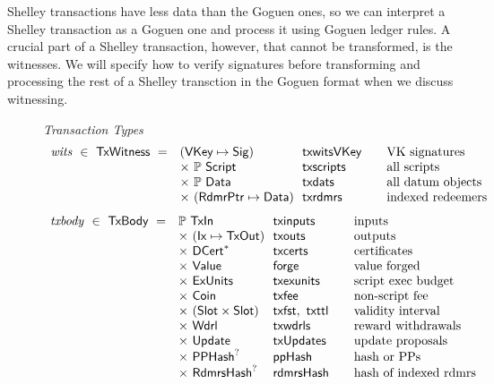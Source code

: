 Shelley transactions have less data than the Goguen ones, so we can interpret
a Shelley transaction as a Goguen one and process it using Goguen ledger
rules. A crucial part of a Shelley transaction,
however, that cannot be transformed, is the witnesses.
We will specify how to verify signatures before transforming and processing
the rest of a Shelley transction in the Goguen format when we discuss witnessing.

\begin{figure*}[htb]
  \emph{Transaction Types}
  \begin{equation*}
    \begin{array}{r@{~~}l@{~~}l@{\qquad}l}
      \var{wits} ~\in~ \TxWitness ~=~
       & (\VKey \mapsto \Sig) & \fun{txwitsVKey} & \text{VK signatures}\\
       & \times ~\powerset{\Script}  & \fun{txscripts} & \text{all scripts}\\
       & \times~ \powerset{\Data} & \fun{txdats} & \text{all datum objects}\\
       & \times ~(\RdmrPtr \mapsto \Data)& \fun{txrdmrs}& \text{indexed redeemers}\\
    \end{array}
  \end{equation*}
  \begin{equation*}
    \begin{array}{r@{~~}l@{~~}l@{\qquad}l}
      \var{txbody} ~\in~ \TxBody ~=~
      & \powerset{\TxIn} & \fun{txinputs}& \text{inputs}\\
      &\times ~(\Ix \mapsto \TxOut) & \fun{txouts}& \text{outputs}\\
      & \times~ \seqof{\DCert} & \fun{txcerts}& \text{certificates}\\
       & \times ~\Value  & \fun{forge} &\text{value forged}\\
       & \times ~\ExUnits  & \fun{txexunits}& \text{script exec budget}\\
       & \times ~\Coin & \fun{txfee} &\text{non-script fee}\\
       & \times ~(\Slot\times\Slot) & \fun{txfst},~\fun{txttl} & \text{validity interval}\\
       & \times~ \Wdrl  & \fun{txwdrls} &\text{reward withdrawals}\\
       & \times ~\Update  & \fun{txUpdates} & \text{update proposals}\\
       & \times ~\PPHash^?  & \fun{ppHash} & \text{hash or PPs}\\
       & \times ~\RdmrsHash^? & \fun{rdmrsHash} & \text{hash of indexed rdmrs}\\

\end{array}
\end{equation*}
\end{figure*}
